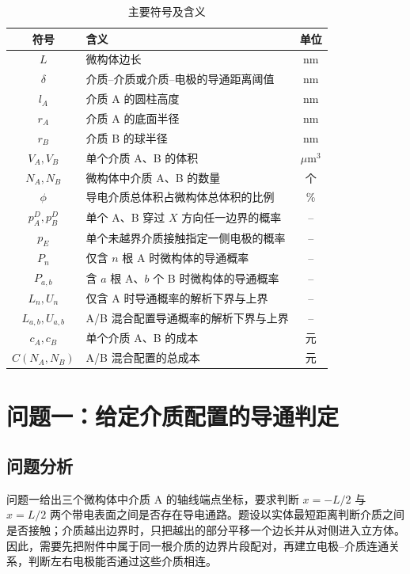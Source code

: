 \documentclass[withoutpreface,bwprint]{cumcmthesis}
\begin{document}
\begin{table}[H]
\centering
\caption{主要符号及含义}
\label{tab:symbols}
\small
\begin{tabularx}{0.94\textwidth}{c>{\raggedright\arraybackslash}Xc}
\toprule
符号 & 含义 & 单位 \\
\midrule
$L$ & 微构体边长 & nm \\
$\delta$ & 介质--介质或介质--电极的导通距离阈值 & nm \\
$l_A$ & 介质 A 的圆柱高度 & nm \\
$r_A$ & 介质 A 的底面半径 & nm \\
$r_B$ & 介质 B 的球半径 & nm \\
$V_A,V_B$ & 单个介质 A、B 的体积 & $\mu\mathrm{m}^3$ \\
$N_A,N_B$ & 微构体中介质 A、B 的数量 & 个 \\
$\phi$ & 导电介质总体积占微构体总体积的比例 & \% \\
$p_A^D,p_B^D$ & 单个 A、B 穿过 $X$ 方向任一边界的概率 & -- \\
$p_E$ & 单个未越界介质接触指定一侧电极的概率 & -- \\
$P_n$ & 仅含 $n$ 根 A 时微构体的导通概率 & -- \\
$P_{a,b}$ & 含 $a$ 根 A、$b$ 个 B 时微构体的导通概率 & -- \\
$L_n,U_n$ & 仅含 A 时导通概率的解析下界与上界 & -- \\
$L_{a,b},U_{a,b}$ & A/B 混合配置导通概率的解析下界与上界 & -- \\
$c_A,c_B$ & 单个介质 A、B 的成本 & 元 \\
$C(N_A,N_B)$ & A/B 混合配置的总成本 & 元 \\
\bottomrule
\end{tabularx}
\end{table}

\section{问题一：给定介质配置的导通判定}

\subsection{问题分析}

问题一给出三个微构体中介质 A 的轴线端点坐标，要求判断 $x=-L/2$ 与 $x=L/2$ 两个带电表面之间是否存在导电通路。题设以实体最短距离判断介质之间是否接触；介质越出边界时，只把越出的部分平移一个边长并从对侧进入立方体。因此，需要先把附件中属于同一根介质的边界片段配对，再建立电极--介质连通关系，判断左右电极能否通过这些介质相连。
\end{document}
